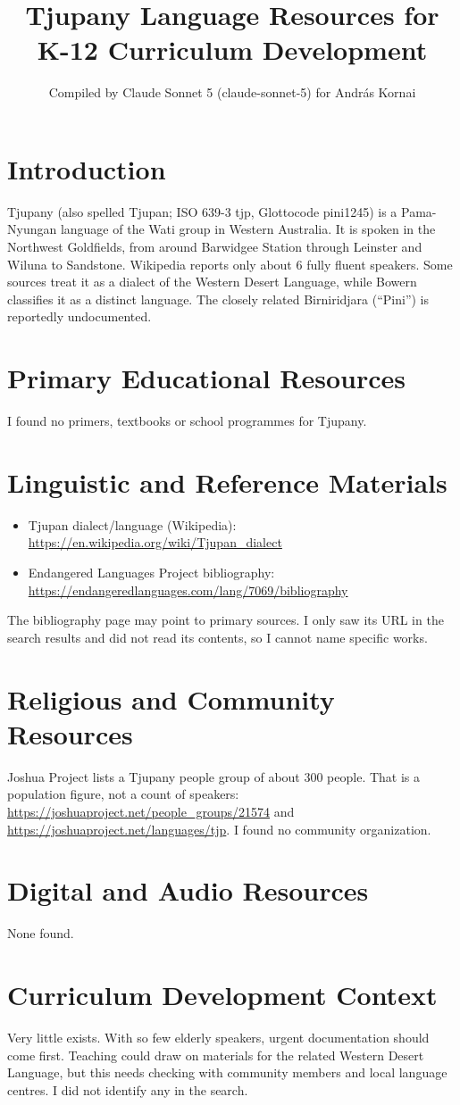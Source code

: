\documentclass[12pt]{article}
\title{Tjupany Language Resources for K-12 Curriculum Development}
\author{Compiled by Claude Sonnet 5 (claude-sonnet-5) for Andr\'as Kornai}
\date{}
\begin{document}
\maketitle

\section{Introduction}
Tjupany (also spelled Tjupan; ISO 639-3 tjp, Glottocode pini1245) is a Pama-Nyungan language of the Wati group in Western Australia. It is spoken in the Northwest Goldfields, from around Barwidgee Station through Leinster and Wiluna to Sandstone. Wikipedia reports only about 6 fully fluent speakers. Some sources treat it as a dialect of the Western Desert Language, while Bowern classifies it as a distinct language. The closely related Birniridjara (``Pini'') is reportedly undocumented.

\section{Primary Educational Resources}
I found no primers, textbooks or school programmes for Tjupany.

\section{Linguistic and Reference Materials}
\begin{itemize}
\item Tjupan dialect/language (Wikipedia): \url{https://en.wikipedia.org/wiki/Tjupan_dialect}
\item Endangered Languages Project bibliography: \url{https://endangeredlanguages.com/lang/7069/bibliography}
\end{itemize}
The bibliography page may point to primary sources. I only saw its URL in the search results and did not read its contents, so I cannot name specific works.

\section{Religious and Community Resources}
Joshua Project lists a Tjupany people group of about 300 people. That is a population figure, not a count of speakers: \url{https://joshuaproject.net/people_groups/21574} and \url{https://joshuaproject.net/languages/tjp}. I found no community organization.

\section{Digital and Audio Resources}
None found.

\section{Curriculum Development Context}
Very little exists. With so few elderly speakers, urgent documentation should come first. Teaching could draw on materials for the related Western Desert Language, but this needs checking with community members and local language centres. I did not identify any in the search.
\end{document}
